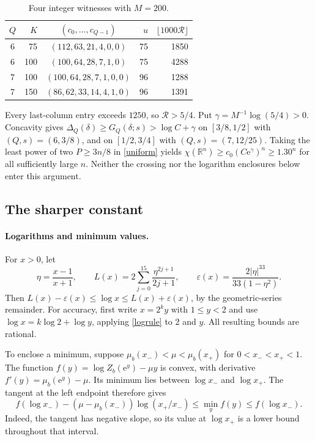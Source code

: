 \documentclass[12pt,a4paper]{article}
\newcommand{\R}{\mathbb R}
\newcommand{\ee}{\mathrm e}
\begin{document}
\begin{table}[H]
\centering
\caption{Four integer witnesses with $M=200$.}
\label{roundedtable}
\renewcommand{\arraystretch}{1.15}
\begin{tabular}{c r c r r}
\toprule
$Q$ & $K$ & $(c_0,\ldots,c_{Q-1})$ & $u$ & $\lfloor1000\mathcal R\rfloor$\\\midrule
6 & 75 & $(112,63,21,4,0,0)$ & 75 & 1850\\
6 & 100 & $(100,64,28,7,1,0)$ & 75 & 4288\\
7 & 100 & $(100,64,28,7,1,0,0)$ & 96 & 1288\\
7 & 150 & $(86,62,33,14,4,1,0)$ & 96 & 1391\\\bottomrule
\end{tabular}
\end{table}

Every last-column entry exceeds $1250$, so $\mathcal R>5/4$. Put $\gamma=M^{-1}\log(5/4)>0$. Concavity gives $\Delta_Q(\delta)\ge G_Q(\delta;s)>\log C+\gamma$ on $[3/8,1/2]$ with $(Q,s)=(6,3/8)$, and on $[1/2,3/4]$ with $(Q,s)=(7,12/25)$. Taking the least power of two $P\ge3n/8$ in \eqref{uniform} yields $\chi(\R^n)\ge c_0(C\ee^\gamma)^n\ge1.30^n$ for all sufficiently large $n$. Neither the crossing nor the logarithm enclosures below enter this argument.

\subsection{The sharper constant}\label{sharp}

\paragraph{Logarithms and minimum values.}
For $x>0$, let
\begin{equation}\label{logrule}
\eta=\frac{x-1}{x+1},\qquad
L(x)=2\sum_{j=0}^{15}\frac{\eta^{2j+1}}{2j+1},\qquad
\varepsilon(x)=\frac{2|\eta|^{33}}{33(1-\eta^2)}.
\end{equation}
Then $L(x)-\varepsilon(x)\le\log x\le L(x)+\varepsilon(x)$, by the geometric-series remainder. For accuracy, first write $x=2^k y$ with $1\le y<2$ and use $\log x=k\log2+\log y$, applying \eqref{logrule} to $2$ and $y$. All resulting bounds are rational.

To enclose a minimum, suppose $\mu_b(x_-)<\mu<\mu_b(x_+)$ for $0<x_-<x_+<1$. The function $f(y)=\log Z_b(\ee^y)-\mu y$ is convex, with derivative $f'(y)=\mu_b(\ee^y)-\mu$. Its minimum lies between $\log x_-$ and $\log x_+$. The tangent at the left endpoint therefore gives
\begin{equation}\label{minimumrule}
f(\log x_-)-(\mu-\mu_b(x_-))\log(x_+/x_-)
\le\min_y f(y)\le f(\log x_-).
\end{equation}
Indeed, the tangent has negative slope, so its value at $\log x_+$ is a lower bound throughout that interval.
\end{document}
